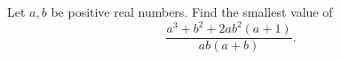 Let $a,b$ be positive real numbers. Find the smallest value of
\[
\dfrac{a^3+b^2+2ab^2(a+1)}{ab(a+b)} .
\]
